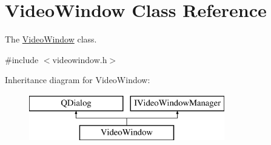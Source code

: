 \hypertarget{classVideoWindow}{\section{Video\-Window Class Reference}
\label{classVideoWindow}
}


The \hyperlink{classVideoWindow}{Video\-Window} class.  




{\ttfamily \#include $<$videowindow.\-h$>$}

Inheritance diagram for Video\-Window\-:\begin{figure}[H]
\begin{center}
\leavevmode
\includegraphics[height=2.000000cm]{classVideoWindow}
\end{center}
\end{figure}

